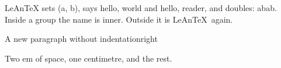 \newcommand{\name}{LeAnTeX}
\newcommand{\pair}[2]{(#1, #2)}
\newcommand{\greet}[1][world]{hello, #1}
\def\twice#1{#1#1}
\name{} sets \pair{a}{b}, says \greet{} and \greet[reader], and doubles: \twice{ab}.
{\renewcommand{\name}{inner} Inside a group the name is \name.} Outside it is \name\ again.
\setlength{\parindent}{0pt}

\noindent A new paragraph without indentation\hfill right\par
\hspace{2em}Two em of space, \hspace{1cm}one centimetre, and \hspace{\fill}the rest.
